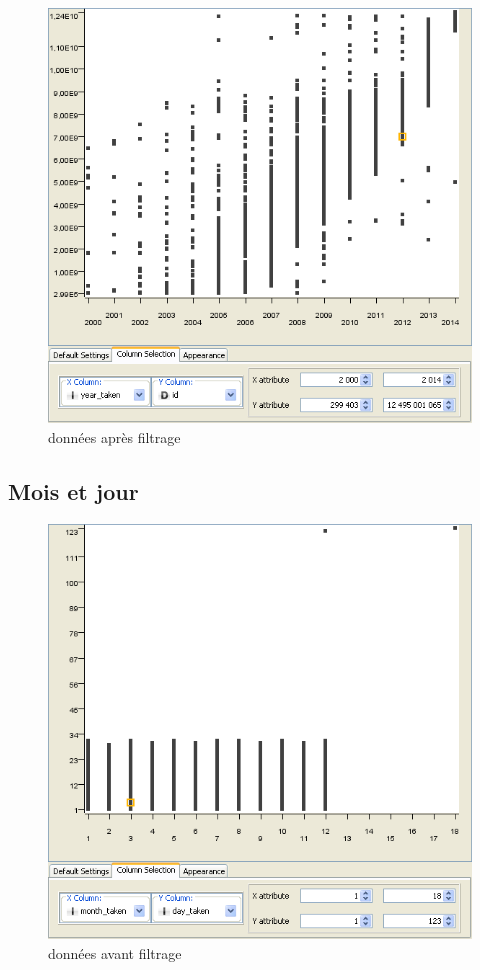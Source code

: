         \begin{figure}[h]
            \centering
            \includegraphics[scale=0.35]{../screenshots/year_id_after.png}
            \caption{données apr\`es filtrage}
            \label{diagram:year_id_after}
        \end{figure}

    \pagebreak
    \subsection{Mois et jour}
        \begin{figure}[h]
            \centering
            \includegraphics[scale=0.35]{../screenshots/month_day_before.png}
            \caption{données avant filtrage}
            \label{diagram:month_day_before}
        \end{figure}

